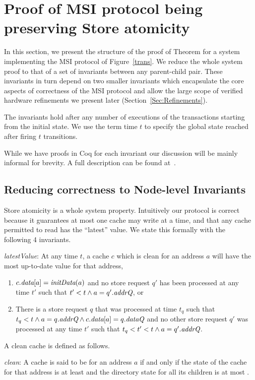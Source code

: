 \section{Proof of MSI protocol being preserving Store atomicity}
\label{Sec:Safety}

In this section, we present the structure of the proof of Theorem
 for a system implementing the MSI protocol of
Figure~\ref{trans}. We reduce the whole system proof to that of a set
of invariants between any parent-child pair. These invariants in turn
depend on two smaller invariants which encapsulate the core aspects of
correctness of the MSI protocol and allow the large scope of verified
hardware refinements we present later (Section~\ref{Sec:Refinements}).

The invariants hold after any number of executions of the transactions
starting from the initial state. We use the term time $t$ to specify
the global state reached after firing $t$ transitions.

While we have proofs in Coq for each invariant our discussion will be mainly
informal for brevity. A full description can be found at~.

\subsection{Reducing correctness to Node-level Invariants}

Store atomicity is a whole system property. Intuitively our
protocol is correct because it guarantees at most one cache may
write at a time, and that any cache permitted to read has
the ``latest'' value. We state this formally with the following 4
invariants.

\begin{inv}
\textit{latestValue}:
At any time $t$, a cache $c$ which is clean for an address $a$ will have the most
up-to-date value for that address, \ie{}
\begin{enumerate}
\item $c.\textit{data}[a] = \textit{initData}(a)$ and no store request $q'$ has been processed at
any time $t'$ such that $t' < t \wedge a = q'.\textit{addrQ}$, or
\item There is a store request $q$ that was processed at time $t_q$ such that
$t_q < t \wedge a = q.\textit{addrQ} \wedge c.\textit{data}[a] = q.\textit{dataQ}$ and no other store
request $q'$ was processed at any time $t'$ such that $t_q < t' < t \wedge a =
q'.\textit{addrQ}$.
\end{enumerate}
\label{latestValue}
\end{inv}
A clean cache is defined as follows.
\begin{defn}
\textit{clean}: A cache is said to be \clean{} for an address $a$ if and only if
the state of the cache for that address is at least \Sh{} and the directory 
state for all its children is at most \Sh.
\end{defn}

